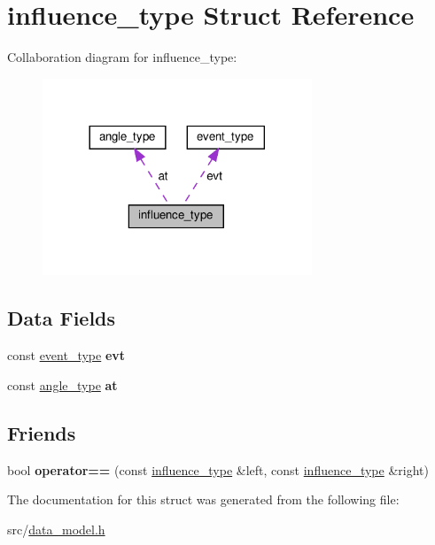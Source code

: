 \hypertarget{structinfluence__type}{}\section{influence\+\_\+type Struct Reference}
\label{structinfluence__type}


Collaboration diagram for influence\+\_\+type\+:\nopagebreak
\begin{figure}[H]
\begin{center}
\leavevmode
\includegraphics[width=228pt]{df/d32/structinfluence__type__coll__graph}
\end{center}
\end{figure}
\subsection*{Data Fields}
\begin{DoxyCompactItemize}
\item 
\mbox{\label{structinfluence__type_a54609d8fd03b51d5a1961db4739af731}} 
const \hyperlink{structevent__type}{event\+\_\+type} {\bfseries evt}
\item 
\mbox{\label{structinfluence__type_a1232197d61a8bebc4d5c64ec54745aa3}} 
const \hyperlink{structangle__type}{angle\+\_\+type} {\bfseries at}
\end{DoxyCompactItemize}
\subsection*{Friends}
\begin{DoxyCompactItemize}
\item 
\mbox{\label{structinfluence__type_a4f5b42686b09f580c15f8fa9f3aa296f}} 
bool {\bfseries operator==} (const \hyperlink{structinfluence__type}{influence\+\_\+type} \&left, const \hyperlink{structinfluence__type}{influence\+\_\+type} \&right)
\end{DoxyCompactItemize}


The documentation for this struct was generated from the following file\+:\begin{DoxyCompactItemize}
\item 
src/\hyperlink{data__model_8h}{data\+\_\+model.\+h}\end{DoxyCompactItemize}
